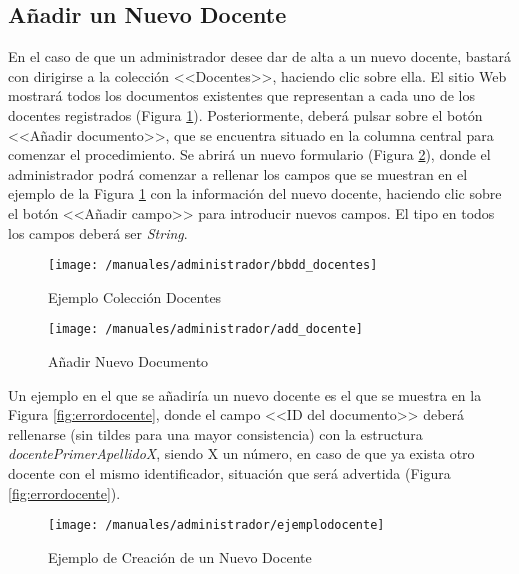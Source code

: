 \subsection*{Añadir un Nuevo Docente}
En el caso de que un administrador desee dar de alta a un nuevo docente, bastará con dirigirse a la colección <<Docentes>>, haciendo clic sobre ella. El sitio Web mostrará todos los documentos existentes que representan a cada uno de los docentes registrados (Figura \ref{fig:bbdddocentes}). Posteriormente, deberá pulsar sobre el botón <<Añadir documento>>, que se encuentra situado en la columna central para comenzar el procedimiento. Se abrirá un nuevo formulario (Figura \ref{fig:adddocente}), donde el administrador podrá comenzar a rellenar los campos que se muestran en el ejemplo de la Figura \ref{fig:bbdddocentes} con la información del nuevo docente, haciendo clic sobre el botón <<Añadir campo>> para introducir nuevos campos. El tipo en todos los campos deberá ser \textit{String}.

\begin{figure}[!h]
	\begin{center}
		\texttt{[image: /manuales/administrador/bbdd\_docentes]}
		\caption{Ejemplo Colección Docentes}
		\label{fig:bbdddocentes}
	\end{center}
\end{figure}

\begin{figure}[!h]
	\begin{center}
		\texttt{[image: /manuales/administrador/add\_docente]}
		\caption{Añadir Nuevo Documento}
		\label{fig:adddocente}
	\end{center}
\end{figure}

\clearpage

Un ejemplo en el que se añadiría un nuevo docente es el que se muestra en la Figura \ref{fig:errordocente}, donde el campo <<ID del documento>> deberá rellenarse (sin tildes para una mayor consistencia) con la estructura \mbox{\textit{docentePrimerApellidoX}}, siendo X un número, en caso de que ya exista otro docente con el mismo identificador, situación que será advertida (Figura \ref{fig:errordocente}).

\begin{figure}[!h]
	\begin{center}
		\texttt{[image: /manuales/administrador/ejemplodocente]}
		\caption{Ejemplo de Creación de un Nuevo Docente}
		\label{fig:ejemploocente}
	\end{center}
\end{figure}

